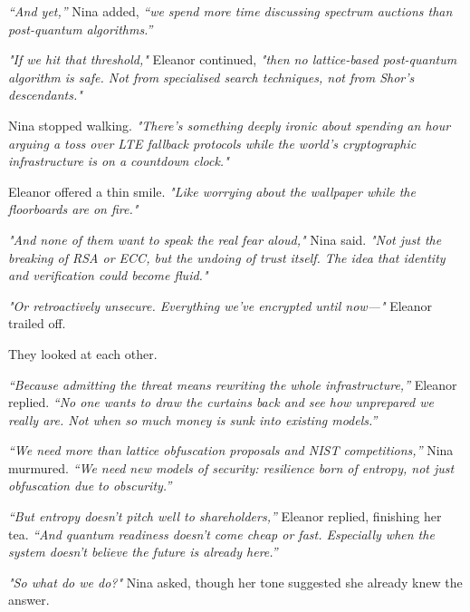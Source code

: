 \smallskip

\textit{``And yet,''} Nina added, \textit{``we spend more time discussing spectrum auctions than post-quantum algorithms.''}

\smallskip

\textit{"If we hit that threshold,"} Eleanor continued, \textit{"then no lattice-based post-quantum algorithm is safe. Not from specialised search techniques, not from Shor’s descendants."}

Nina stopped walking. \textit{"There’s something deeply ironic about spending an hour arguing a toss over LTE fallback protocols while the world's cryptographic infrastructure is on a countdown clock."}

\smallskip

Eleanor offered a thin smile. \textit{"Like worrying about the wallpaper while the floorboards are on fire."}

\smallskip

\textit{"And none of them want to speak the real fear aloud,"} Nina said. \textit{"Not just the breaking of RSA or ECC, but the undoing of trust itself. The idea that identity and verification could become fluid."}

\textit{"Or retroactively unsecure. Everything we’ve encrypted until now---"} Eleanor trailed off.

\smallskip

They looked at each other.

\smallskip

\textit{``Because admitting the threat means rewriting the whole infrastructure,''} Eleanor replied. \textit{``No one wants to draw the curtains back and see how unprepared we really are. Not when so much money is sunk into existing models.''}

\smallskip

\textit{``We need more than lattice obfuscation proposals and NIST competitions,''} Nina murmured. \textit{``We need new models of security: resilience born of entropy, not just obfuscation due to obscurity.''}

\smallskip

\textit{``But entropy doesn’t pitch well to shareholders,''} Eleanor replied, finishing her tea. \textit{``And quantum readiness doesn’t come cheap or fast. Especially when the system doesn’t believe the future is already here.''}

\smallskip

\textit{"So what do we do?"} Nina asked, though her tone suggested she already knew the answer.

